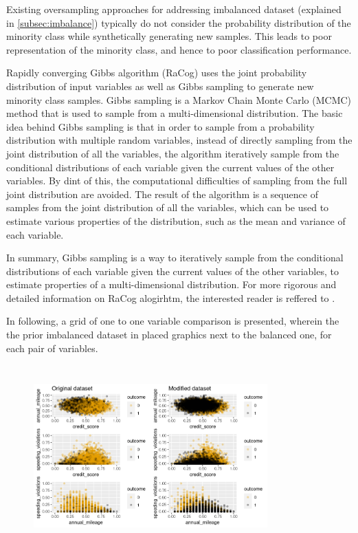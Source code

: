 \documentclass{article}
\begin{document}
Existing oversampling approaches for addressing imbalanced dataset
(explained in \ref{subsec:imbalance}) typically do not consider the
probability distribution of the minority class while synthetically
generating new samples. This leads to poor representation of the
minority class, and hence to poor classification performance.

Rapidly converging Gibbs algorithm (RaCog) uses the joint probability
distribution of input variables as well as Gibbs sampling to generate
new minority class samples. Gibbs sampling is a Markov Chain Monte Carlo
(MCMC) method \cite{bishop} that is used to sample from a
multi-dimensional distribution. The basic idea behind Gibbs sampling is
that in order to sample from a probability distribution with multiple
random variables, instead of directly sampling from the joint
distribution of all the variables, the algorithm iteratively sample from
the conditional distributions of each variable given the current values
of the other variables. By dint of this, the computational difficulties
of sampling from the full joint distribution are avoided. The result of
the algorithm is a sequence of samples from the joint distribution of
all the variables, which can be used to estimate various properties of
the distribution, such as the mean and variance of each variable.

In summary, Gibbs sampling is a way to iteratively sample from the
conditional distributions of each variable given the current values of
the other variables, to estimate properties of a multi-dimensional
distribution. For more rigorous and detailed information on RaCog
alogirhtm, the interested reader is reffered to \cite{racog}.

In following, a grid of one to one variable comparison is presented,
wherein the the prior imbalanced dataset in placed graphics next to the
balanced one, for each pair of variables.

\begin{figure}[H] 
    \centerline{\includegraphics[width=9cm, height=7cm]{./figures/plotcompare.png}}
\end{figure}
\end{document}

